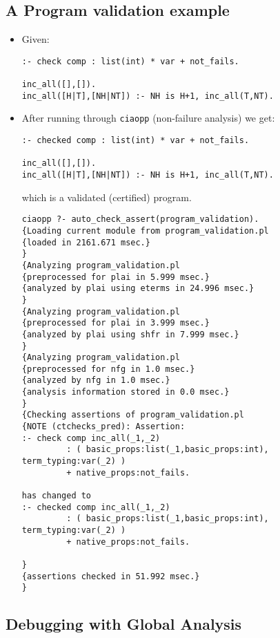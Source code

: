 \documentclass{article}
\renewcommand{\_}{\char'137}
\begin{document}
\subsection{A Program validation example}

\begin{itemize}
\item Given:
\begin{verbatim}
:- check comp : list(int) * var + not_fails.

inc_all([],[]).
inc_all([H|T],[NH|NT]) :- NH is H+1, inc_all(T,NT).
\end{verbatim}

\item After running through \texttt{ciaopp} (non-failure analysis) we get:
\begin{verbatim}
:- checked comp : list(int) * var + not_fails.

inc_all([],[]).
inc_all([H|T],[NH|NT]) :- NH is H+1, inc_all(T,NT).
\end{verbatim}
which is a validated (certified) program.

\begin{verbatim}
ciaopp ?- auto_check_assert(program_validation).
{Loading current module from program_validation.pl
{loaded in 2161.671 msec.}
}
{Analyzing program_validation.pl
{preprocessed for plai in 5.999 msec.}
{analyzed by plai using eterms in 24.996 msec.}
}
{Analyzing program_validation.pl
{preprocessed for plai in 3.999 msec.}
{analyzed by plai using shfr in 7.999 msec.}
}
{Analyzing program_validation.pl
{preprocessed for nfg in 1.0 msec.}
{analyzed by nfg in 1.0 msec.}
{analysis information stored in 0.0 msec.}
}
{Checking assertions of program_validation.pl
{NOTE (ctchecks_pred): Assertion:
:- check comp inc_all(_1,_2)
         : ( basic_props:list(_1,basic_props:int), term_typing:var(_2) )
         + native_props:not_fails.

has changed to
:- checked comp inc_all(_1,_2)
         : ( basic_props:list(_1,basic_props:int), term_typing:var(_2) )
         + native_props:not_fails.

}
{assertions checked in 51.992 msec.}
}
\end{verbatim}


\end{itemize}

\subsection{Debugging with Global Analysis} 
\end{document}
